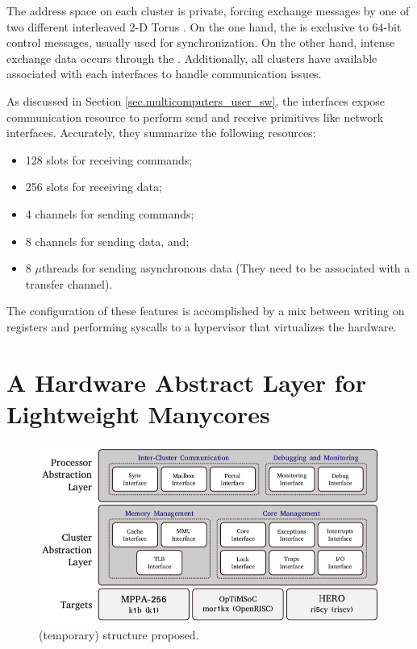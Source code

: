			The address space on each cluster is private, forcing exchange messages
			by one of two different interleaved 2-D Torus \nocs.
			On the one hand, the \cnoc is exclusive to 64-bit control messages,
			usually used for synchronization.
			On the other hand, intense exchange data occurs through the \dnoc.
			Additionally, all clusters have available \dmas associated with each
			\noc interfaces to handle communication issues.

			As discussed in Section \ref{sec.multicomputers_user_sw}, the \noc interfaces
			expose communication resource to perform send and receive primitives
			like network interfaces.
			Accurately, they summarize the following resources:

			\begin{itemize}
				\item 128 slots for receiving commands;
				\item 256 slots for receiving data;
				\item 4 channels for sending commands;
				\item 8 channels for sending data, and;
				\item 8 $\mu$threads for sending asynchronous data
					(They need to be associated with a transfer channel).
			\end{itemize}

			The configuration of these features is accomplished by a mix between
			writing on \dma registers and performing syscalls to a hypervisor
			that virtualizes the \mppa hardware.	
	
\section{A Hardware Abstract Layer for Lightweight Manycores}
\label{sec.hal}

	\begin{figure}[h]
		\centering
		\includegraphics[width=.9\textwidth]{images/hal-struct.png}

		\caption{
			(temporary) \hal structure proposed.
		}\par
		\label{fig.hal_struct}
	\end{figure}
	
